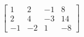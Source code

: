 \documentclass[preview]{standalone}
\begin{document}
\begin{align*}
\left[\begin{array}{ccc|c} 1 & 2 & -1 & 8 \\ 2 & 4 & -3 & 14 \\ -1 & -2 & 1 & -8 \end{array}\right]
\end{align*}
\end{document}
